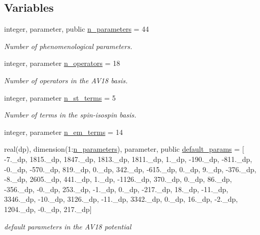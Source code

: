 \subsection*{Variables}
\begin{DoxyCompactItemize}
\item 
integer, parameter, public \hyperlink{namespaceav18_a227e50c056ed5f33a1de8f7536c2393b}{n\+\_\+parameters} = 44
\begin{DoxyCompactList}\small\item\em Number of phenomenological parameters. \end{DoxyCompactList}\item 
integer, parameter \hyperlink{namespaceav18_a360396af16932b4172038bd146cb1e0a}{n\+\_\+operators} = 18
\begin{DoxyCompactList}\small\item\em Number of operators in the A\+V18 basis. \end{DoxyCompactList}\item 
integer, parameter \hyperlink{namespaceav18_ae95361ff4578323939542bc0807d127d}{n\+\_\+st\+\_\+terms} = 5
\begin{DoxyCompactList}\small\item\em Number of terms in the spin-\/isospin basis. \end{DoxyCompactList}\item 
integer, parameter \hyperlink{namespaceav18_abdf1bd7208851f82a6773c558de0602f}{n\+\_\+em\+\_\+terms} = 14
\item 
real(dp), dimension(1\+:\hyperlink{namespaceav18_a227e50c056ed5f33a1de8f7536c2393b}{n\+\_\+parameters}), parameter, public \hyperlink{namespaceav18_a8a031093cf20f6305f0a0b8f557c1deb}{default\+\_\+params} = \mbox{[} -\/7.\+\_\+dp, 1815.\+\_\+dp, 1847.\+\_\+dp, 1813.\+\_\+dp, 1811.\+\_\+dp, 1.\+\_\+dp, -\/190.\+\_\+dp, -\/811.\+\_\+dp, -\/0.\+\_\+dp, -\/570.\+\_\+dp, 819.\+\_\+dp, 0.\+\_\+dp, 342.\+\_\+dp, -\/615.\+\_\+dp, 0.\+\_\+dp, 9.\+\_\+dp, -\/376.\+\_\+dp, -\/8.\+\_\+dp, 2605.\+\_\+dp, 441.\+\_\+dp, 1.\+\_\+dp, -\/1126.\+\_\+dp, 370.\+\_\+dp, 0.\+\_\+dp, 86.\+\_\+dp, -\/356.\+\_\+dp, -\/0.\+\_\+dp, 253.\+\_\+dp, -\/1.\+\_\+dp, 0.\+\_\+dp, -\/217.\+\_\+dp, 18.\+\_\+dp, -\/11.\+\_\+dp, 3346.\+\_\+dp, -\/10.\+\_\+dp, 3126.\+\_\+dp, -\/11.\+\_\+dp, 3342.\+\_\+dp, 0.\+\_\+dp, 16.\+\_\+dp, -\/2.\+\_\+dp, 1204.\+\_\+dp, -\/0.\+\_\+dp, 217.\+\_\+dp\mbox{]}
\begin{DoxyCompactList}\small\item\em default parameters in the A\+V18 potential \end{DoxyCompactList}\end{DoxyCompactItemize}


